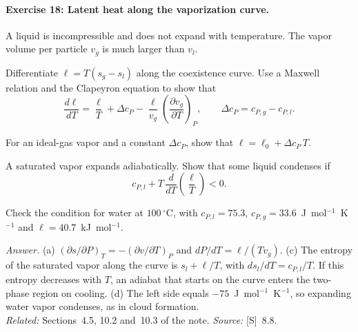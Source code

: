\documentclass[11pt]{article}      %
\numberwithin{equation}{section}   %
\begin{document}
\paragraph{Exercise 18: Latent heat along the vaporization curve.}
A liquid is incompressible and does not expand with temperature. The vapor volume per particle $v_g$ is much larger than $v_l$.
\begin{parts}
    \item Differentiate $\ell = T(s_g - s_l)$ along the coexistence curve. Use a Maxwell relation and the Clapeyron equation to show that
    \begin{equation*}
        \frac{d\ell}{dT} = \frac{\ell}{T} + \Delta c_P - \frac{\ell}{v_g}\left(\frac{\partial v_g}{\partial T}\right)_P,
        \qquad \Delta c_P = c_{P,g} - c_{P,l}.
    \end{equation*}
    \item For an ideal-gas vapor and a constant $\Delta c_P$, show that $\ell = \ell_0 + \Delta c_P\,T$.
    \item A saturated vapor expands adiabatically. Show that some liquid condenses if
    \begin{equation*}
        c_{P,l} + T\,\frac{d}{dT}\!\left(\frac{\ell}{T}\right) < 0.
    \end{equation*}
    \item Check the condition for water at $100\,^\circ$C, with $c_{P,l} = 75.3$, $c_{P,g} = 33.6$~J~mol$^{-1}$~K$^{-1}$ and $\ell = 40.7$~kJ~mol$^{-1}$.
\end{parts}
\textit{Answer.} (a) $(\partial s/\partial P)_T = -(\partial v/\partial T)_P$ and $dP/dT = \ell/(Tv_g)$. (c) The entropy of the saturated vapor along the curve is $s_l + \ell/T$, with $ds_l/dT = c_{P,l}/T$. If this entropy decreases with $T$, an adiabat that starts on the curve enters the two-phase region on cooling. (d) The left side equals $-75$~J~mol$^{-1}$~K$^{-1}$, so expanding water vapor condenses, as in cloud formation.\\
\textit{Related:} Sections~4.5, 10.2 and~10.3 of the note. \textit{Source:} [S]~8.8.
\end{document}
